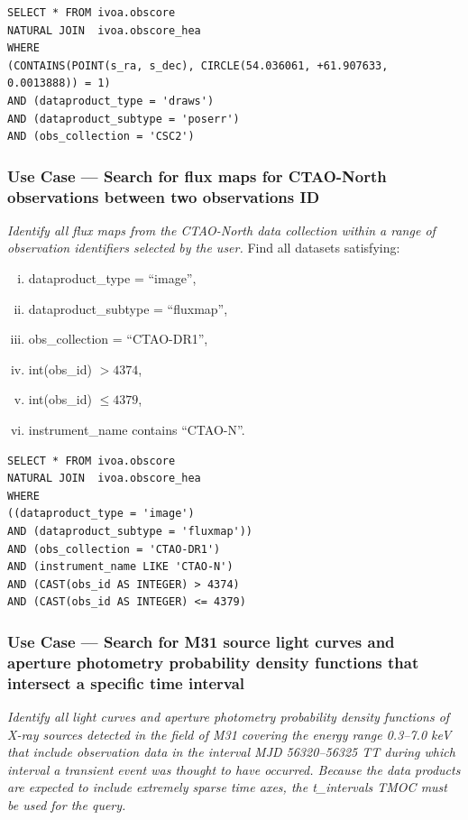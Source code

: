 \begin{verbatim}
SELECT * FROM ivoa.obscore
NATURAL JOIN  ivoa.obscore_hea
WHERE
(CONTAINS(POINT(s_ra, s_dec), CIRCLE(54.036061, +61.907633, 0.0013888)) = 1)
AND (dataproduct_type = 'draws')
AND (dataproduct_subtype = 'poserr')
AND (obs_collection = 'CSC2')
\end{verbatim}


\subsubsection{Use Case --- Search for flux maps for CTAO-North observations between two observations ID}

{\em Identify all flux maps from the CTAO-North data collection within a range of observation identifiers selected by the user.\/}
\medskip
\noindent Find all datasets satisfying:
\begin{enumerate}[(i)]
  \item dataproduct\_type = ``image'',
  \item dataproduct\_subtype = ``fluxmap'',
  \item obs\_collection = ``CTAO-DR1'',
  \item int(obs\_id) $> 4374$,
  \item int(obs\_id) $\leq 4379$,
  \item  instrument\_name contains ``CTAO-N''.
\end{enumerate}

\begin{verbatim}
SELECT * FROM ivoa.obscore
NATURAL JOIN  ivoa.obscore_hea
WHERE
((dataproduct_type = 'image')
AND (dataproduct_subtype = 'fluxmap'))
AND (obs_collection = 'CTAO-DR1')
AND (instrument_name LIKE 'CTAO-N')
AND (CAST(obs_id AS INTEGER) > 4374)
AND (CAST(obs_id AS INTEGER) <= 4379)
\end{verbatim}


\subsubsection{Use Case --- Search for M31 source light curves and aperture photometry probability density functions that intersect a specific time interval}

{\em Identify all light curves and aperture photometry probability density functions of X-ray sources detected in the field of M31 covering the energy range 0.3--7.0 keV that include observation data in the interval MJD 56320--56325 TT during which interval a transient event was thought to have occurred.  Because the data products are expected to include extremely sparse time axes, the t\_intervals TMOC must be used for the query.\/}

